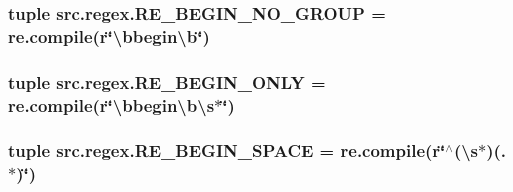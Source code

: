\hypertarget{namespacesrc_1_1regex_a792df301d2ccfc5b4fa4cfe70c1f04c3}{
\subsubsection[{R\-E\-\_\-\-B\-E\-G\-I\-N\-\_\-\-N\-O\-\_\-\-G\-R\-O\-U\-P}]{\setlength{\rightskip}{0pt plus 5cm}tuple src.\-regex.\-R\-E\-\_\-\-B\-E\-G\-I\-N\-\_\-\-N\-O\-\_\-\-G\-R\-O\-U\-P = re.\-compile(r\char`\"{}\textbackslash{}bbegin\textbackslash{}b\char`\"{})}}\label{namespacesrc_1_1regex_a792df301d2ccfc5b4fa4cfe70c1f04c3}
\hypertarget{namespacesrc_1_1regex_af038a49f2c08aa8f2edd2607f74e5ed4}{
\subsubsection[{R\-E\-\_\-\-B\-E\-G\-I\-N\-\_\-\-O\-N\-L\-Y}]{\setlength{\rightskip}{0pt plus 5cm}tuple src.\-regex.\-R\-E\-\_\-\-B\-E\-G\-I\-N\-\_\-\-O\-N\-L\-Y = re.\-compile(r\char`\"{}\textbackslash{}bbegin\textbackslash{}b\textbackslash{}s$\ast$\char`\"{})}}\label{namespacesrc_1_1regex_af038a49f2c08aa8f2edd2607f74e5ed4}
\hypertarget{namespacesrc_1_1regex_a74a9c58b10580d28dd7df4ec2df33355}{
\subsubsection[{R\-E\-\_\-\-B\-E\-G\-I\-N\-\_\-\-S\-P\-A\-C\-E}]{\setlength{\rightskip}{0pt plus 5cm}tuple src.\-regex.\-R\-E\-\_\-\-B\-E\-G\-I\-N\-\_\-\-S\-P\-A\-C\-E = re.\-compile(r\char`\"{}$^\wedge$(\textbackslash{}s$\ast$)(.$\ast$)\char`\"{})}}\label{namespacesrc_1_1regex_a74a9c58b10580d28dd7df4ec2df33355}
